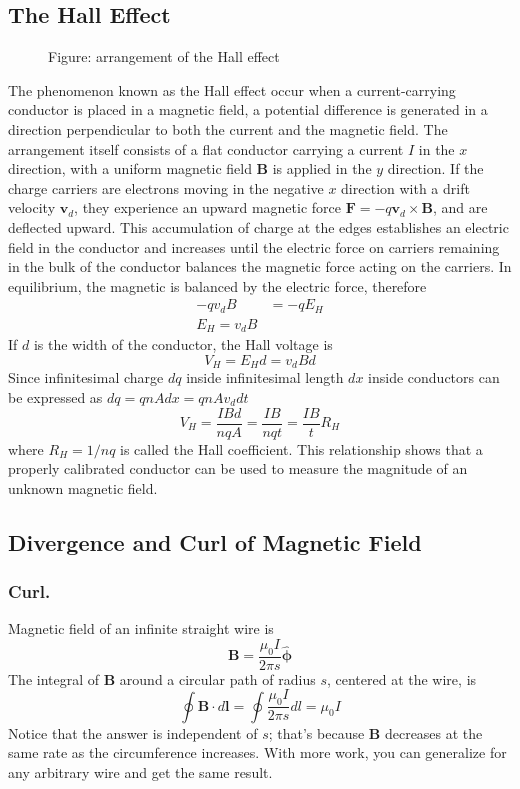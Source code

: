 \documentclass[../../../main.tex]{subfiles}
\begin{document}
\subsection{The Hall Effect} 
\begin{figure*}[t]
    \centering
    \caption*{Figure: arrangement of the Hall effect}
\end{figure*}
The phenomenon known as the Hall effect occur when a current-carrying conductor is placed in a magnetic field, a potential difference is generated in a direction perpendicular to both the current and the magnetic field. The arrangement itself consists of a flat conductor carrying a current $I$ in the $x$ direction, with a uniform magnetic field \textbf{B} is applied in the $y$ direction. If the charge carriers are electrons moving in the negative $x$ direction with a drift velocity $\mathbf{v}_d$, they experience an upward magnetic force $\mathbf{F}=-q\mathbf{v}_d\times\mathbf{B}$, and are deflected upward. This accumulation of charge at the edges establishes an electric field in the conductor and increases until the electric force on carriers remaining in the bulk of the conductor balances the magnetic force acting on the carriers. In equilibrium, the magnetic is balanced by the electric force, therefore
\begin{align*}
    -qv_dB&=-qE_H\\
    E_H=v_dB
\end{align*}
If $d$ is the width of the conductor, the Hall voltage is
\begin{equation*}
    V_H=E_Hd=v_dBd
\end{equation*}
Since infinitesimal charge $dq$ inside infinitesimal length $dx$ inside conductors can be expressed as $dq=qnAdx=qnAv_ddt$
\begin{equation*}
    V_H=\frac{IBd}{nqA}=\frac{IB}{nqt}=\frac{IB}{t}R_H
\end{equation*}
where $R_H=1/nq$ is called the Hall coefficient. This relationship shows that a properly calibrated conductor can be used to measure the magnitude of an unknown magnetic field. 

\subsection{Divergence and Curl of Magnetic Field}
\subsubsection{Curl.} Magnetic field of an inﬁnite straight wire is
\begin{equation*}
    \mathbf{B}=\frac{\mu_0I}{2\pi s}\boldsymbol{\hat{\phi}}
\end{equation*}
The integral of \textbf{B} around a circular path of radius $s$, centered at the wire, is
\begin{equation*}
    \oint \mathbf{B}\cdot d\mathbf{l}=\oint\frac{\mu_0I}{2\pi s}dl=\mu_0I
\end{equation*}
Notice that the answer is independent of $s$; that's because \textbf{B} decreases at the same rate as the circumference increases. With more work, you can generalize for any arbitrary wire and get the same result. 
\end{document}
